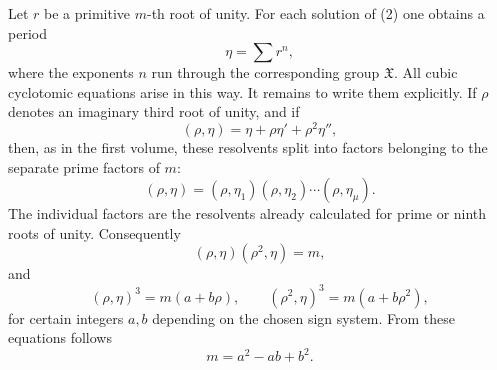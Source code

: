 \documentclass[11pt]{article}
\providecommand{\grpX}{\mathfrak X}
\begin{document}
Let $r$ be a primitive $m$-th root of unity.  For each solution of (2) one obtains a period
\begin{equation}
   \eta=\sum r^n,
   \tag{3}
\end{equation}
where the exponents $n$ run through the corresponding group $\grpX$.  All cubic cyclotomic equations arise in this way.  It remains to write them explicitly.  If $\rho$ denotes an imaginary third root of unity, and if
\begin{equation}
   (\rho,\eta)=\eta+\rho\eta'+\rho^2\eta'',
   \tag{4}
\end{equation}
then, as in the first volume, these resolvents split into factors belonging to the separate prime factors of $m$:
\begin{equation}
   (\rho,\eta)=(\rho,\eta_1)(\rho,\eta_2)\cdots(\rho,\eta_\mu).
   \tag{5}
\end{equation}
The individual factors are the resolvents already calculated for prime or ninth roots of unity.  Consequently
\begin{equation}
   (\rho,
\eta)(\rho^2,\eta)=m,
   \tag{6}
\end{equation}
and
\begin{equation}
   (\rho,
\eta)^3=m(a+b\rho),
   \qquad
   (\rho^2,
\eta)^3=m(a+b\rho^2),
   \tag{7}
\end{equation}
for certain integers $a,b$ depending on the chosen sign system.  From these equations follows
\begin{equation}
   m=a^2-ab+b^2 .
   \tag{8}
\end{equation}
\end{document}
